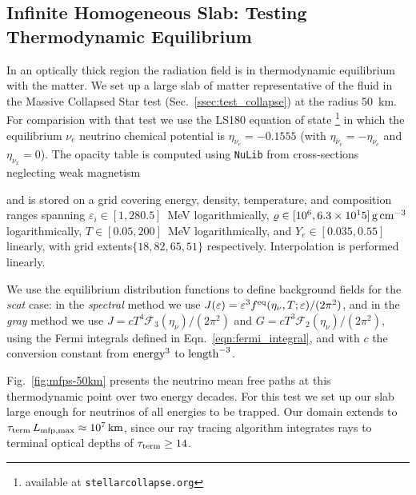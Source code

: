 \documentclass[aps,floatfix,prd,superscriptaddress,twocolumn]{revtex4-1}
\newcommand{\todo}[1]{\marginpar{\tiny{\textcolor{red}{#1}}}}
\renewcommand\todo[1]{} %
\begin{document}
\subsection{Infinite Homogeneous Slab:
  Testing Thermodynamic Equilibrium}
\label{ssec:test_equilibrium}
In an optically thick region the radiation field is in thermodynamic equilibrium
with the matter.
We set up a large slab of matter
representative of the fluid in the Massive Collapsed Star test
(Sec.~\ref{ssec:test_collapse}) at the radius 50~km.
For comparision with that test we use the LS180 equation of state
\cite{latt1991-nuc_eos}
\footnote{available at \lstinline{stellarcollapse.org}}
in which the equilibrium $\nu_e$ neutrino chemical potential is
$\eta_{\nu_e}=-0.1555$
(with $\eta_{\bar{\nu}_e}=-\eta_{\nu_e}$ and $\eta_{\nu_x}=0$).
The opacity table is computed using \lstinline{NuLib} from cross-sections
neglecting weak magnetism
\todo{anything else?}
and is stored on a grid covering energy, density, temperature, and composition
ranges spanning $\varepsilon_i\in[1,280.5]$~MeV logarithmically,
$\varrho\in[10^6,6.3\times10^15]\,{\rm g}\,{\rm cm}^{-3}$ logarithmically,
$T\in[0.05,200]$~MeV logarithmically, and 
$Y_e\in[0.035,0.55]$ linearly,
with grid extents$\{18,82,65,51\}$ respectively.
Interpolation is performed linearly.

We use the equilibrium distribution functions to define background
fields for the \emph{scat} case:
in the \emph{spectral} method we use
$J(\varepsilon)=\varepsilon^3 f^{\rm eq}(\eta_\nu,T;\varepsilon)/(2\pi^2)$,
and in the \emph{gray} method we use
$J=c T^4 \mathscr{F}_3(\eta_\nu)/(2\pi^2)$ and
$G=c T^3 \mathscr{F}_2(\eta_\nu)/(2\pi^2)$,
using the Fermi integrals defined in Eqn.~\ref{eqn:fermi_integral},
and with $c$ the conversion constant from ${\rm energy}^3$ to ${\rm length}^{-3}$.

Fig.~\ref{fig:mfps-50km} presents the neutrino mean free paths
at this thermodynamic point over two energy decades.
For this test we set up our slab large enough for neutrinos of all
energies to be trapped.
Our domain extends to $\tau_{\rm term}\,L_{\rm mfp,max}\approx10^7\,{\rm km}$,
since our ray tracing algorithm integrates rays to terminal optical
depths of $\tau_{\rm term}\geq14$.
\end{document}
